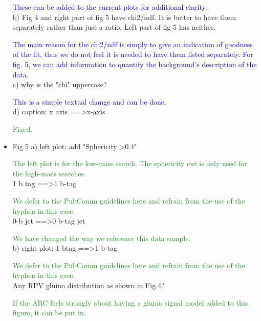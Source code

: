 \documentclass[paper=a4, fontsize=11pt]{scrartcl}
\begin{document}
\begin{itemize}
\textcolor{Blue}{These can be added to the current plots for additional clarity.}\\


b) Fig 4 and right part of fig 5 have chi2/ndf. It is better to have them 
separately rather than just a ratio. Left part of fig 5 has neither. 

\textcolor{Blue}{The main reason for the chi2/ndf is simply to give an
indication of goodness of the fit, thus we do not feel it is needed to
have them listed separately. For fig. 5, we can add information to quantify
the background's description of the data.}\\


c) why is the "chi" uppercase? 

\textcolor{Blue}{This is a simple textual change and can be done.}\\


d) caption: x axis ==\textgreater x-axis 

\textcolor{ForestGreen}{Fixed.}\\

\item Fig.5 
a) left plot: 
add "Sphericity \textgreater 0.4" 

\textcolor{ForestGreen}{The left plot is for the low-mass search. The sphericity cut is only used for the
high-mass searches.}\\

1 b tag ==\textgreater 1 b-tag 

\textcolor{ForestGreen}{We defer to the PubComm guidelines here and refrain from the use of the hyphen
in this case.}\\


0-b jet ==\textgreater 0 b-tag jet 

\textcolor{ForestGreen}{We have changed the way we reference this data sample.}\\

b) right plot: 
1 btag ==\textgreater 1 b-tag 

\textcolor{ForestGreen}{We defer to the PubComm guidelines here and refrain from the use of the hyphen
in this case.}\\


Any RPV gluino distribution as shown in Fig.4? 

\textcolor{ForestGreen}{If the ARC feels strongly about having a gluino signal model added to this
figure, it can be put in.}\\


\end{itemize}
\end{document}
